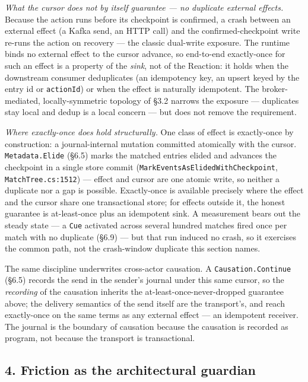 \documentclass[
]{article}
\let\origtexttt\texttt%
\renewcommand{\texttt}[1]{\origtexttt{\seqsplit{#1}}}%
\let\texttt\origtexttt%
\begin{document}
\emph{What the cursor does not by itself guarantee --- no duplicate
external effects.} Because the action runs before its checkpoint is
confirmed, a crash between an external effect (a Kafka send, an HTTP
call) and the confirmed-checkpoint write re-runs the action on recovery
--- the classic dual-write exposure. The runtime binds no external
effect to the cursor advance, so end-to-end exactly-once for such an
effect is a property of the \emph{sink}, not of the Reaction: it holds
when the downstream consumer deduplicates (an idempotency key, an upsert
keyed by the entry id or \texttt{actionId}) or when the effect is
naturally idempotent. The broker-mediated, locally-symmetric topology of
§3.2 narrows the exposure --- duplicates stay local and dedup is a local
concern --- but does not remove the requirement.

\emph{Where exactly-once does hold structurally.} One class of effect is
exactly-once by construction: a journal-internal mutation committed
atomically with the cursor. \texttt{Metadata.Elide} (§6.5) marks the
matched entries elided and advances the checkpoint in a single store
commit (\texttt{MarkEventsAsElidedWithCheckpoint},
\texttt{MatchTree.cs:1512}) --- effect and cursor are one atomic write,
so neither a duplicate nor a gap is possible. Exactly-once is available
precisely where the effect and the cursor share one transactional store;
for effects outside it, the honest guarantee is at-least-once plus an
idempotent sink. A measurement bears out the steady state --- a
\texttt{Cue} activated across several hundred matches fired once per
match with no duplicate (§6.9) --- but that run induced no crash, so it
exercises the common path, not the crash-window duplicate this section
names.

The same discipline underwrites cross-actor causation. A
\texttt{Causation.Continue} (§6.5) records the send in the sender's
journal under this same cursor, so the \emph{recording} of the causation
inherits the at-least-once-never-dropped guarantee above; the delivery
semantics of the send itself are the transport's, and reach exactly-once
on the same terms as any external effect --- an idempotent receiver. The
journal is the boundary of causation because the causation is recorded
as program, not because the transport is transactional.

\subsection{4. Friction as the architectural
guardian}\label{friction-as-the-architectural-guardian}
\end{document}
